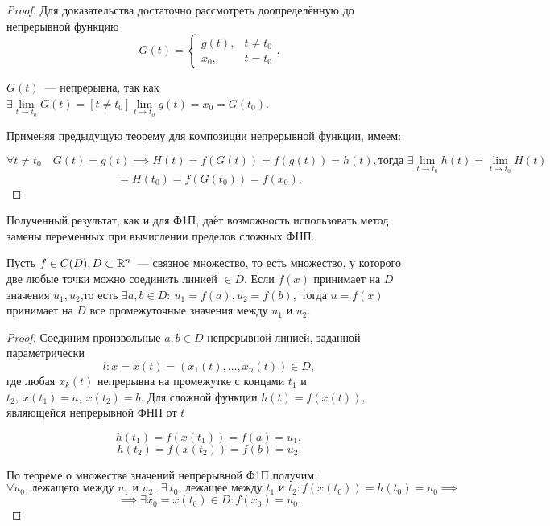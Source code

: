 \documentclass[../../main.tex]{subfiles}
\begin{document}
    \begin{proof}
    	Для доказательства достаточно рассмотреть доопределённую до непрерывной
    	функцию \begin{equation*}
    		G(t) = \begin{cases}
    			g(t),& t \ne t_0\\
    			x_0,& t = t_0 
    		\end{cases}.
    	\end{equation*} 
    	
    $G(t)$~--- непрерывна, так как $\exists \lim\limits_{t \to t_0} G(t) = 
    \left[ t \ne t_0 \right] \lim\limits_{t \to t_0} g(t) = x_0 = G(t_0)$.
    
    Применяя предыдущую теорему для композиции непрерывной функции, имеем:
    
    \[
      	\forall t \ne t_0 \quad G(t) = g(t) \implies H(t) = 
      	f(G(t)) = f(g(t)) = h(t),
      	\text{тогда } \exists \lim\limits_{t \to t_0} h(t) 
      	= \lim\limits_{t \to t_0} H(t) 
    \] 
    \[
   		= H(t_0) = f(G(t_0)) = f(x_0).
    \]
    \end{proof}
    
	Полученный результат, как и для Ф1П, даёт возможность 
	использовать метод замены
	переменных при вычислении пределов сложных ФНП.
	
	\begin{thm}
		Пусть $f \in C(D), D \subset \mathbb{R}^n$~--- связное множество, то есть 
		множество, у которого две любые точки можно соединить линией  $\in D$.
		Если $f(x)$ принимает на $D$ значения $u_1, u_2$,то есть $\exists 
		a, b \in D: \ u_1 = f(a), u_2 = f(b),$ тогда $u = f(x)$ принимает
		на $D$ все промежуточные значения между $u_1$ и $u_2$.
	\end{thm}
	
	\begin{proof}
		Соединим произвольные $a, b \in D$ непрерывной линией, заданной 
		параметрически \[l: x = x(t) = (x_1(t), \ldots, x_n(t))\in D,\]
		где любая $x_k(t)$ непрерывна на промежутке с концами $t_1$ и $t_2,
		\ x(t_1) = a, \ x(t_2) = b$. Для сложной функции $h(t) = f(x(t))$, 
		являющейся непрерывной ФНП от $t$
		
		\[h(t_1) = f(x(t_1)) = f(a) = u_1,\]
		\[h(t_2) = f(x(t_2)) = f(b) = u_2.\]
		
		По теореме о множестве значений непрерывной Ф1П получим:
		\[
		\forall u_0 \text{, лежащего между } u_1\text{ и } u_2 , \ \exists \ t_0
		\text{, лежащее между } t_1\text{ и } t_2 :f(x(t_0)) = h(t_0) = u_0 \implies
		\]
		\[
		\implies \exists x_0 = x(t_0) \in D : f(x_0) = u_0.
		\]
	\end{proof}
	
\end{document}
